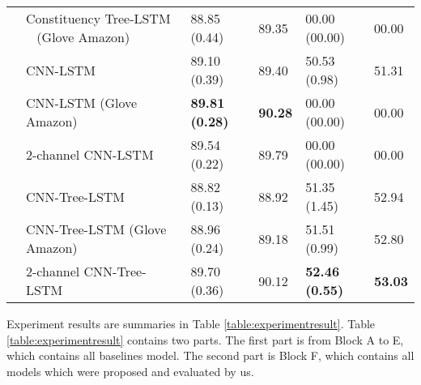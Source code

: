 \begin{table*}[]
\begin{tabular}{|c|l|ll|ll|}
		\Xhline{3\arrayrulewidth}
		\multirow{6}{*}{F} & Constituency Tree-LSTM ~\cite{treeLSTM} (Glove Amazon) & 88.85 (0.44) & 89.35 & 00.00 (00.00) & 00.00 \Tstrut \\
		 & CNN-LSTM                                 & 89.10 (0.39)  & 89.40 & 50.53 (0.98) & 51.31 \\
		  & CNN-LSTM (Glove Amazon) & \textbf{89.81 (0.28)} & \textbf{90.28}  & 00.00 (00.00) & 00.00 \\
		& 2-channel CNN-LSTM                        & 89.54    (0.22) & 89.79 & 00.00 (00.00) & 00.00 \\
		 & CNN-Tree-LSTM                            & 88.82 (0.13) & 88.92 & 51.35 (1.45) & 52.94 \\
		& CNN-Tree-LSTM (Glove Amazon)             & 88.96 (0.24) & 89.18 & 51.51 (0.99) & 52.80 \\
		& 2-channel CNN-Tree-LSTM  & 89.70 (0.36) & 90.12  & \textbf{52.46 (0.55)} & \textbf{53.03} \Bstrut  \\
		\hline
	\end{tabular}
\end{table*}
Experiment results are summaries in Table \ref{table:experimentresult}.
Table \ref{table:experimentresult} contains two parts.
The first part is from Block A to E, which contains all baselines model.
The second part is Block F, which contains all models which were proposed and evaluated by us.
